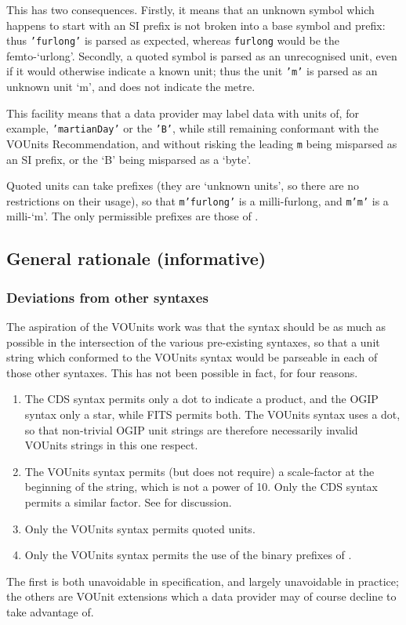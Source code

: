 \documentclass[11pt,notitlepage,onecolumn]{ivoa}
\newcommand{\unit}[1]{\texttt{\small\color{orange}#1}}
\begin{document}
This has two consequences.  Firstly, it means that an unknown symbol
which happens to start with an SI prefix is not broken
into a base symbol and prefix: thus \unit{'furlong'} is parsed as
expected, whereas \unit{furlong} would be the femto-`urlong'.
Secondly, a quoted symbol is parsed as an unrecognised unit, even if
it would otherwise indicate a known unit; thus the unit \unit{'m'} is
parsed as an unknown unit `m', and does not indicate the metre.

This facility means that a data provider may label data with units of,
for example, \unit{'martianDay'} or the \unit{'B'}, while still
remaining conformant with the VOUnits Recommendation, and without
risking the leading \texttt{m} being misparsed as an SI prefix, or the
`B' being misparsed as a `byte'.

Quoted units can take prefixes (they are `unknown units', so there are
no restrictions on their usage), so that \unit{m'furlong'} is a
milli-furlong, and \unit{m'm'} is a milli-`m'.  The only permissible
prefixes are those of .

\subsection{General rationale (informative)}
\label{sec:rationale}

\subsubsection{Deviations from other syntaxes}
\label{sec:deviations}

The aspiration of the VOUnits work was that the syntax should be as
much as possible in the intersection of the various pre-existing
syntaxes, so that a unit string which conformed to the VOUnits syntax
would be parseable in each of those other syntaxes.  This has not been
possible in fact, for four reasons.
\begin{enumerate}
\item The CDS syntax permits only a dot to indicate a product, and the
OGIP syntax only a star, while FITS permits both.  The VOUnits syntax
uses a dot, so that non-trivial OGIP unit strings are therefore
necessarily invalid VOUnits strings in this one respect.
\item The VOUnits syntax permits (but does not require) a scale-factor
at the beginning of the string, which is not a power of 10.  Only the
CDS syntax permits a similar factor.
See  for discussion.
\item Only the VOUnits syntax permits quoted units.
\item Only the VOUnits syntax permits the use of the binary prefixes
of .
\end{enumerate}
The first is both unavoidable in specification, and largely
unavoidable in practice; the others are VOUnit extensions which a data
provider may of course decline to take advantage of.
\end{document}
